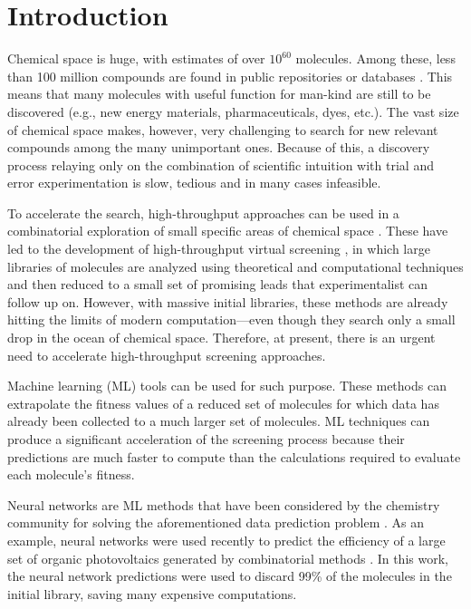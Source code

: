 \section{Introduction}

Chemical space is huge, with estimates of over $10^{60}$ molecules. Among
these, less than 100 million compounds are found in public repositories or
databases \cite{Reymond_2012}. This means that many molecules with
useful function for man-kind are still to be discovered (e.g., new energy
materials, pharmaceuticals, dyes, etc.). The vast size of chemical space makes,
however, very challenging to search for new relevant compounds among the many
unimportant ones. Because of this, a discovery process relaying only on
the combination of scientific intuition with trial and error experimentation is slow, tedious and in many cases infeasible.

To accelerate the search, high-throughput approaches can be used in a
combinatorial exploration of small specific areas of chemical space \cite{Rajan_2008}. These have led to the development of
high-throughput virtual screening \cite{Pyzer_Knapp_2015,Halls_2010,Curtarolo_2013,Husch_2015,Subramaniam_2008,Shoichet_2004,Jain_2013}, in which large libraries of molecules are analyzed using
theoretical and computational techniques and then reduced to a small set of
promising leads that experimentalist can follow up on. However, with massive initial libraries, these methods are already
hitting the limits of modern computation---even though they search only a small
drop in the ocean of chemical space. Therefore, at present, there is an urgent
need to accelerate high-throughput screening approaches.

Machine learning (ML) tools can be used for such purpose. These methods can
extrapolate the fitness values of a reduced set of molecules for which data has
already been collected to a much larger set of molecules.  ML techniques can
produce a significant acceleration of the screening process because their
predictions are much faster to compute than the calculations required to
evaluate each molecule's fitness.

Neural networks are ML methods that have been considered by the chemistry
community for solving the aforementioned data prediction problem \cite{Zupan_1991,Burden_1996,Rodemerck_2004,Myint_2012,DuvMacetal15nfp}. As an example, neural networks  were used
recently to predict the efficiency of a large set of organic
photovoltaics generated by combinatorial methods \cite{Pyzer_Knapp_2015a}. In this work, the neural network
predictions were used to discard 99\% of the molecules in the initial
library, saving many expensive computations.

